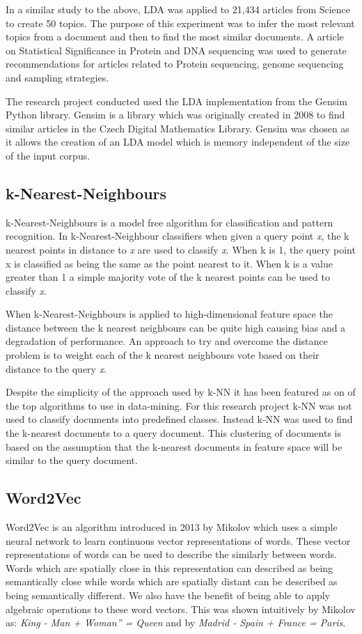 In a similar study to the above, LDA was applied to 21,434 articles from Science to create 50 topics.
The purpose of this experiment was to infer the most relevant topics from a document and then to find the most similar documents.
A article on Statistical Significance in Protein and DNA sequencing was used to generate recommendations for articles related to Protein sequencing, genome sequencing and sampling strategies.

The research project conducted used the LDA implementation from the Gensim Python library.
Gensim is a library which was originally created in 2008 to find similar articles in the Czech Digital Mathematics Library.
Gensim was chosen as it allows the creation of an LDA model which is memory independent of the size of the input corpus.
\cite{rehurek_lrec}


\subsection{k-Nearest-Neighbours}
k-Nearest-Neighbours is a model free algorithm for classification and pattern recognition.
In k-Nearest-Neighbour classifiers when given a query point \textit{x}, the k nearest points in distance to \textit{x} are used to classify \textit{x}.
When k is 1, the query point x is classified as being the same as the point nearest to it.
When k is a value greater than 1 a simple majority vote of the k nearest points can be used to classify \textit{x}.\cite{elementsStat}

When k-Nearest-Neighbours is applied to high-dimensional feature space the distance between the k nearest neighbours can be quite high causing bias and a degradation of performance.\cite{elementsStat}
An approach to try and overcome the distance problem is to weight each of the k nearest neighbours vote based on their distance to the query \textit{x}.\cite{top10datamining}

Despite the simplicity of the approach used by k-NN it has been featured as on of the top algorithms to use in data-mining.\cite{top10datamining}
For this research project k-NN was not used to classify documents into predefined classes.
Instead k-NN was used to find the k-nearest documents to a query document.
This clustering of documents is based on the assumption that the k-nearest documents in feature space will be similar to the query document.

\subsection{Word2Vec}
Word2Vec is an algorithm introduced in 2013 by Mikolov which uses a simple neural network to learn continuous vector representations of words.
These vector representations of words can be used to describe the similarly between words.
Words which are spatially close in this representation can described as being semantically close while words which are spatially distant can be described as being semantically different.
We also have the benefit of being able to apply algebraic operations to these  word vectors.
This was shown intuitively by Mikolov as: \textit{King - Man + Woman” = Queen} and by \textit{Madrid - Spain + France = Paris}.

